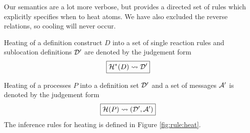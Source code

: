 Our semantics are a lot more verbose, but provides a directed set of rules
which explicitly specifies when to heat atoms. We have also excluded the
reverse relations, so cooling will never occur.

Heating of a definition construct $D$ into a set of single reaction rules and
sublocation definitions $\mathcal{D}'$ are denoted by the judgement form
\begin{equation*}
  \boxed{\mathcal{H}^*(D) \leadsto \mathcal{D}'}
\end{equation*}

Heating of a processes $P$ into a definition set $\mathcal{D}'$ and a set of messages
$\mathcal{A}'$ is denoted by the judgement form
\begin{equation*}
  \boxed{\mathcal{H}(P) \leadsto (\mathcal{D}', \mathcal{A}')}
\end{equation*}
The inference rules for heating is defined in Figure \ref{fig:rule:heat}.

